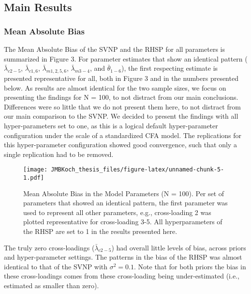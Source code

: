 \documentclass[
  man, donotrepeattitle,floatsintext]{apa6}
\begin{document}
\hypertarget{main-results}{%
\subsection{Main Results}\label{main-results}}

\hypertarget{mean-absolute-bias-1}{%
\subsubsection{Mean Absolute Bias}\label{mean-absolute-bias-1}}

The Mean Absolute Bias of the SVNP and the RHSP for all parameters is summarized in Figure 3. For parameter estimates that show an identical pattern (\(\bar{\lambda}_{c 2-5}\), \(\bar{\lambda}_{c 1, 6}\), \(\bar{\lambda}_{m 1, 2, 5, 6}\), \(\bar{\lambda}_{m 3-4}\), and \(\bar{\theta}_{1-6}\)), the first respecting estimate is presented representative for all, both in Figure 3 and in the numbers presented below. As results are almost identical for the two sample sizes, we focus on presenting the findings for N = 100, to not distract from our main conclusions. Differences were so little that we do not present them here, to not distract from our main comparison to the SVNP. We decided to present the findings with all hyper-parameters set to one, as this is a logical default hyper-parameter configuration under the scale of a standardized CFA model. The replications for this hyper-parameter configuration showed good convergence, such that only a single replication had to be removed.

\begin{figure}
\centering
\texttt{[image: JMBKoch\_thesis\_files/figure-latex/unnamed-chunk-5-1.pdf]}
\caption{\label{fig:unnamed-chunk-5}Mean Absolute Bias in the Model Parameters (N = 100). Per set of parameters that showed an identical pattern, the first parameter was used to represent all other parameters, e.g., cross-loading 2 was plotted representative for cross-loading 3-5. All hyperparameters of the RHSP are set to 1 in the results presented here.}
\end{figure}

The truly zero cross-loadings (\(\bar{\lambda}_{c 2-5}\)) had overall little levels of bias, across priors and hyper-parameter settings. The patterns in the bias of the RHSP was almost identical to that of the SVNP with \(\sigma^2 = 0.1\). Note that for both priors the bias in these cross-loadings comes from these cross-loading being under-estimated (i.e., estimated as smaller than zero).
\end{document}
